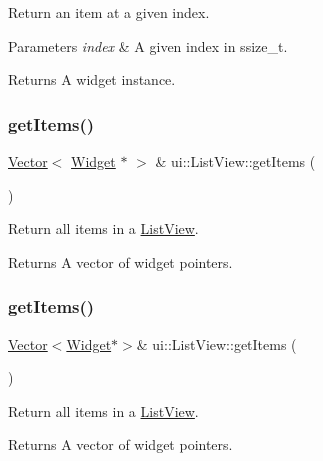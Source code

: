 Return an item at a given index.


\begin{DoxyParams}{Parameters}
{\em index} & A given index in ssize\+\_\+t. \\
\hline
\end{DoxyParams}
\begin{DoxyReturn}{Returns}
A widget instance. 
\end{DoxyReturn}
\mbox{\label{classui_1_1ListView_a92a6e83bdbfec80ae5133ab7ccd0a824}} 
\subsubsection{\texorpdfstring{get\+Items()}{getItems()}\hspace{0.1cm}{\footnotesize\ttfamily [1/2]}}
{\footnotesize\ttfamily \hyperlink{classVector}{Vector}$<$ \hyperlink{classui_1_1Widget}{Widget} $\ast$ $>$ \& ui\+::\+List\+View\+::get\+Items (\begin{DoxyParamCaption}{ }\end{DoxyParamCaption})}

Return all items in a \hyperlink{classui_1_1ListView}{List\+View}. \begin{DoxyReturn}{Returns}
A vector of widget pointers. 
\end{DoxyReturn}
\mbox{\label{classui_1_1ListView_a4b746fb73635a3b5302fc3493d7eb725}} 
\subsubsection{\texorpdfstring{get\+Items()}{getItems()}\hspace{0.1cm}{\footnotesize\ttfamily [2/2]}}
{\footnotesize\ttfamily \hyperlink{classVector}{Vector}$<$\hyperlink{classui_1_1Widget}{Widget}$\ast$$>$\& ui\+::\+List\+View\+::get\+Items (\begin{DoxyParamCaption}{ }\end{DoxyParamCaption})}

Return all items in a \hyperlink{classui_1_1ListView}{List\+View}. \begin{DoxyReturn}{Returns}
A vector of widget pointers. 
\end{DoxyReturn}
\mbox{\label{classui_1_1ListView_a1b035dc59aabb5c9addcef3e16917900}} 
